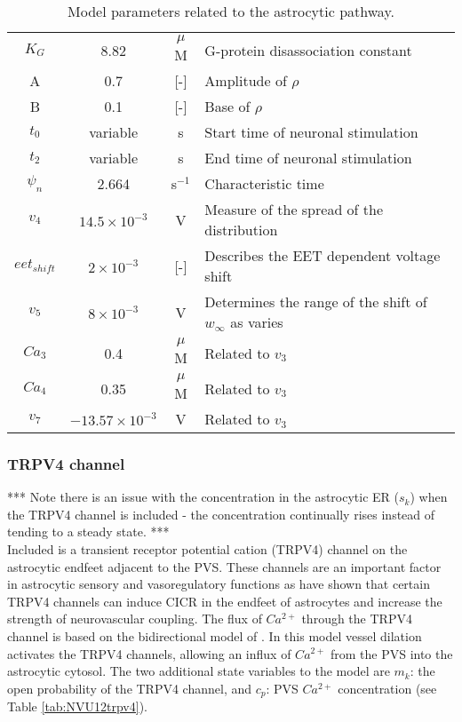 \begin{table}[p!]
\begin{tabular}{c c c p{110mm}}
					$K_G$ & 8.82 & $\mu$M & G-protein disassociation constant \\
					A & 0.7 & [-] & Amplitude of $\rho$ \\
					B & 0.1 & [-] & Base of $\rho$ \\
					$t_0$ & variable & s & Start time of neuronal stimulation \\
					$t_2$ & variable & s & End time of neuronal stimulation \\
					$\psi_n$ & 2.664 & s$^{-1}$ & Characteristic time \\
					$v_4$ & $14.5 \times 10^{-3}$ & V & Measure of the spread of the distribution \\
					$eet_{shift}$ & $2 \times 10^{-3}$ & [-] & Describes the EET dependent voltage shift \\
					$v_5$ & $8 \times 10^{-3}$ & V & Determines the range of the shift of $w_{\infty}$ as \ca varies \\
					$Ca_3$ & 0.4 & $\mu$M & Related to $v_3$ \\
					$Ca_4$ & 0.35 & $\mu$M & Related to $v_3$ \\
					$v_7$ & $-13.57 \times 10^{-3}$ & V & Related to $v_3$ \\
					\hline
						\end{tabular}
						\caption{Model parameters related to the astrocytic \ca pathway.}
						\label{tab:NVU12accaparam}
				\end{table}
	

	\subsubsection{TRPV4 channel}
	
	*** Note there is an issue with the \ca concentration in the astrocytic ER ($s_k$) when the TRPV4 channel is included - the concentration continually rises instead of tending to a steady state. ***
	\\
	
	Included is a transient receptor potential cation (TRPV4) channel on the astrocytic endfeet adjacent to the PVS.
	These channels are an important factor in astrocytic sensory and vasoregulatory functions as \cite{Dunn2013} have shown that certain TRPV4 channels can induce CICR in the endfeet of astrocytes and increase the strength of neurovascular coupling.
	The flux of $Ca^{2+}$ through the TRPV4 channel is based on the bidirectional model of \cite{Witthoft2012}.
	In this model vessel dilation activates the TRPV4 channels, allowing an influx of $Ca^{2+}$ from the PVS into the astrocytic cytosol. 
	The two additional state variables to the model are
	$m_k$: the open probability of the TRPV4 channel, and $c_p$: PVS $Ca^{2+}$ concentration (see Table \ref{tab:NVU12trpv4}).
			
